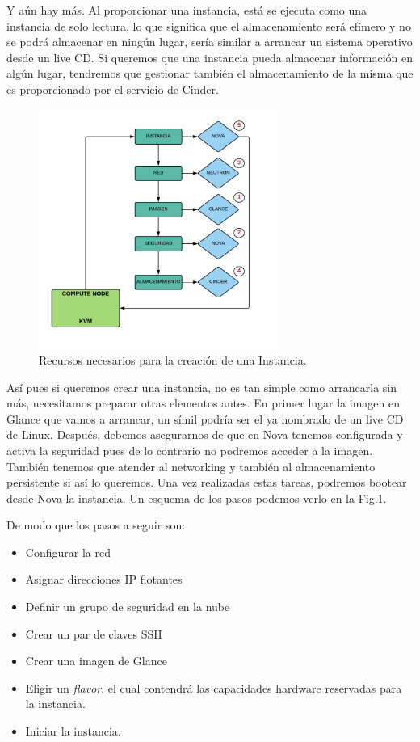 Y aún hay más. Al proporcionar una instancia, está se ejecuta como una instancia de solo lectura, lo que significa que el almacenamiento será efímero y no se podrá almacenar en ningún lugar, sería similar a arrancar un sistema operativo desde un live CD. Si queremos que una instancia pueda almacenar información en algún lugar, tendremos que gestionar también el almacenamiento de la misma que es proporcionado por el servicio de Cinder.

\begin{figure}
    \centering
    \includegraphics[width=0.7\textwidth]{imagenes/capitulo6/recursosInstancia.png}
    \caption{Recursos necesarios para la creación de una Instancia.}
	\vspace{0.3cm}
    \label{recursosInstancia}
\end{figure}

Así pues si queremos crear una instancia, no es tan simple como arrancarla sin más, necesitamos preparar otras elementos antes. En primer lugar la imagen en Glance que vamos a arrancar, un símil podría ser el ya nombrado de un live CD de Linux. Después, debemos asegurarnos de que en Nova tenemos configurada y activa la seguridad  pues de lo contrario no podremos acceder a la imagen. También tenemos que atender al networking y también al almacenamiento persistente si así lo queremos. Una vez realizadas estas tareas, podremos bootear desde Nova la instancia. Un esquema de los pasos podemos verlo en la Fig.\ref{recursosInstancia}.

De modo que los pasos a seguir son:

\begin{itemize}
\item Configurar la red
\item Asignar direcciones IP flotantes
\item Definir un grupo de seguridad en la nube
\item Crear un par de claves SSH
\item Crear una imagen de Glance
\item Eligir un \textit{flavor}, el cual contendrá las capacidades hardware reservadas para la instancia. 
\item Iniciar la instancia.
\end{itemize}

